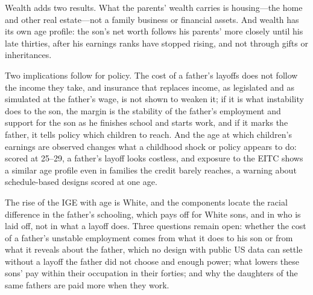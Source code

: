 Wealth adds two results. What the parents' wealth carries is housing---the home and other real estate---not a family business or
financial assets. And wealth has its own age profile: the son's net worth follows his parents' more closely until his
late thirties, after his earnings ranks have stopped rising, and not through gifts or inheritances.

Two implications follow for policy. The cost of a father's layoffs does not follow the income they take, and insurance that
replaces income, as legislated and as simulated at the father's wage, is not shown to weaken it; if it is what
instability does to the son, the margin is the stability of the father's employment and support for the son as he
finishes school and starts work, and if it marks the father, it tells policy which children to reach. And the age at
which children's earnings are observed changes what a childhood shock or policy appears to do: scored at 25--29, a
father's layoff looks costless, and exposure to the EITC shows a similar age profile even in families the credit barely reaches, a warning
about schedule-based designs scored at one age.

The rise of the IGE with age is White, and the components locate the racial difference in the father's schooling, which
pays off for White sons, and in who is laid off, not in what a layoff does. Three questions remain open: whether the cost
of a father's unstable employment comes from what it does to his son or from what it reveals about the father, which no
design with public US data can settle without a layoff the father did not choose and enough power; what lowers these
sons' pay within their occupation in their forties; and why the daughters of the same fathers are paid more when they
work.
